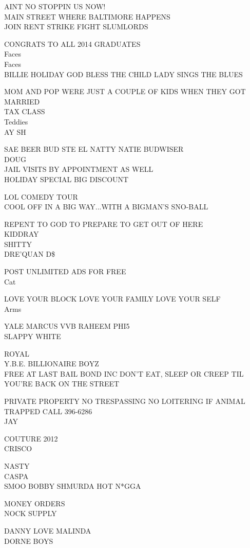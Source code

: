 \documentclass[10pt,letterpaper]{article}
\begin{document}
AINT NO STOPPIN US NOW!\\
MAIN STREET WHERE BALTIMORE HAPPENS\\
JOIN RENT STRIKE FIGHT SLUMLORDS

CONGRATS TO ALL 2014 GRADUATES\\
Faces\\
Faces\\
BILLIE HOLIDAY GOD BLESS THE CHILD LADY SINGS THE BLUES

MOM AND POP WERE JUST A COUPLE OF KIDS WHEN THEY GOT MARRIED\\
TAX CLASS\\
Teddies\\
AY SH

SAE BEER BUD STE EL NATTY NATIE BUDWISER\\
DOUG\\
JAIL VISITS BY APPOINTMENT AS WELL\\
HOLIDAY SPECIAL BIG DISCOUNT

LOL COMEDY TOUR\\
COOL OFF IN A BIG WAY...WITH A BIGMAN'S SNO{-}BALL

REPENT TO GOD TO PREPARE TO GET OUT OF HERE\\
KIDDRAY\\
SHITTY\\
DRE'QUAN D\$

POST UNLIMITED ADS FOR FREE\\
Cat

LOVE YOUR BLOCK LOVE YOUR FAMILY LOVE YOUR SELF\\
Arms

YALE MARCUS VVB RAHEEM PHI5\\
SLAPPY WHITE

ROYAL\\
Y.B.E. BILLIONAIRE BOYZ\\
FREE AT LAST BAIL BOND INC DON'T EAT, SLEEP OR CREEP TIL YOU'RE BACK ON THE STREET

PRIVATE PROPERTY NO TRESPASSING NO LOITERING IF ANIMAL TRAPPED CALL 396{-}6286\\
JAY

COUTURE 2012\\
CRISCO

NASTY\\
CASPA\\
SMOO BOBBY SHMURDA HOT N*GGA

MONEY ORDERS\\
NOCK SUPPLY

DANNY LOVE MALINDA\\
DORNE BOYS
\end{document}

